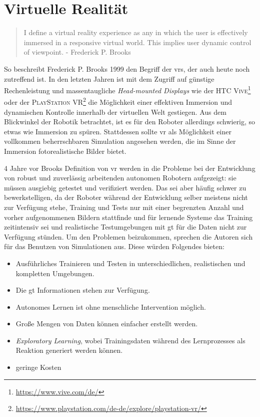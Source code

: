 \section{Virtuelle Realität}

\begin{quote}
\glqq I define a virtual reality experience as any in which the user is effectively immersed in a responsive virtual world. This implies user dynamic control of viewpoint.\grqq \newline
 \hfill - Frederick P. Brooks
\end{quote}
So beschreibt Frederick P. Brooks 1999 \cite{brooks} den Begriff der \glspl{vr}, der auch heute noch zutreffend ist. In den letzten Jahren ist mit dem Zugriff auf günstige Rechenleistung und massentaugliche \textit{Head-mounted Displays} wie der \textsc{HTC Vive}\footnote{\url{https://www.vive.com/de/}} oder der \textsc{PlayStation VR}\footnote{\url{https://www.playstation.com/de-de/explore/playstation-vr/}} die Möglichkeit einer effektiven Immersion und dynamischen Kontrolle innerhalb der virtuellen Welt gestiegen. Aus dem Blickwinkel der Robotik betrachtet, ist es für den Roboter allerdings schwierig, so etwas wie Immersion zu spüren. Stattdessen sollte \gls{vr} als Möglichkeit einer vollkommen beherrschbaren Simulation angesehen werden, die im Sinne der Immersion fotorealistische Bilder bietet.  \par

4 Jahre vor Brooks Definition von \gls{vr} werden in \cite{burger1995} die Probleme bei der Entwicklung von robust und zuverlässig arbeitenden autonomen Robotern aufgezeigt: sie müssen ausgiebig getestet und verifiziert werden. Das sei aber häufig schwer zu bewerkstelligen, da der Roboter während der Entwicklung selber meistens nicht zur Verfügung stehe, Training und Tests nur mit einer begrenzten Anzahl und vorher aufgenommenen Bildern stattfinde und für lernende Systeme das Training zeitintensiv sei und realistische Testumgebungen mit \gls{gt} für die Daten nicht zur Verfügung stünden. Um den Problemen beizukommen, sprechen die Autoren sich für das Benutzen von Simulationen aus. Diese würden Folgendes bieten: 
\begin{itemize}
	\item Ausführliches Trainieren und Testen in unterschiedlichen, realistischen und kompletten Umgebungen.
	\item Die \gls{gt} Informationen stehen zur Verfügung.
	\item Autonomes Lernen ist ohne menschliche Intervention möglich.
	\item Große Mengen von Daten können einfacher erstellt werden.
	\item \textit{Exploratory Learning}, wobei Trainingsdaten während des Lernprozesses als Reaktion generiert werden können. 
	\item geringe Kosten
\end{itemize}

